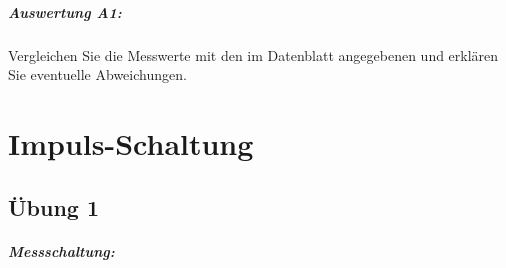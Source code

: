 \documentclass[11pt,a4paper,titlepage,parskip=half]{scrreprt}
\begin{document}
        \paragraph{Auswertung A1:} Vergleichen Sie die Messwerte mit den im Datenblatt angegebenen und erklären Sie
        eventuelle Abweichungen.


  \chapter{Impuls-Schaltung}
    \section{Übung 1}
      \paragraph{Messschaltung:}
\end{document}
